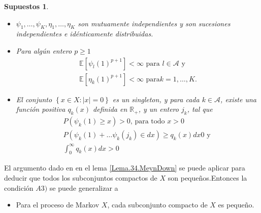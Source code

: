 \documentclass{article}
\newtheorem{Sup}{Supuestos}[section]
\newcommand{\rea}{\mathbb{R}}
\newcommand{\esp}{\mathbb{E}}
\numberwithin{equation}{section}
\begin{document}
\begin{Sup}
\begin{itemize}
\item[A1)] $\psi_{1},\ldots,\psi_{K},\eta_{1},\ldots,\eta_{K}$ son
mutuamente independientes y son sucesiones independientes e
id\'enticamente distribuidas.

\item[A2)] Para alg\'un entero $p\geq1$
\begin{eqnarray*}
\esp\left[\psi_{l}\left(1\right)^{p+1}\right]<\infty\textrm{ para }l\in\mathcal{A}\textrm{ y }\\
\esp\left[\eta_{k}\left(1\right)^{p+1}\right]<\infty\textrm{ para
}k=1,\ldots,K.
\end{eqnarray*}
\item[A3)] El conjunto $\left\{x\in X:|x|=0\right\}$ es un
singleton, y para cada $k\in\mathcal{A}$, existe una funci\'on
positiva $q_{k}\left(x\right)$ definida en $\rea_{+}$, y un entero
$j_{k}$, tal que
\begin{eqnarray}
P\left(\psi_{k}\left(1\right)\geq x\right)>0\textrm{, para todo }x>0\\
P\left(\psi_{k}\left(1\right)+\ldots\psi_{k}\left(j_{k}\right)\in dx\right)\geq q_{k}\left(x\right)dx0\textrm{ y }\\
\int_{0}^{\infty}q_{k}\left(x\right)dx>0
\end{eqnarray}
\end{itemize}
\end{Sup}

El argumento dado en \cite{MaynDown} en el lema
\ref{Lema.34.MeynDown} se puede aplicar para deducir que todos los
subconjuntos compactos de $X$ son peque\~nos.Entonces la
condici\'on $A3)$ se puede generalizar a
\begin{itemize}
\item[A3')] Para el proceso de Markov $X$, cada subconjunto
compacto de $X$ es peque\~no.
\end{itemize}
\end{document}
